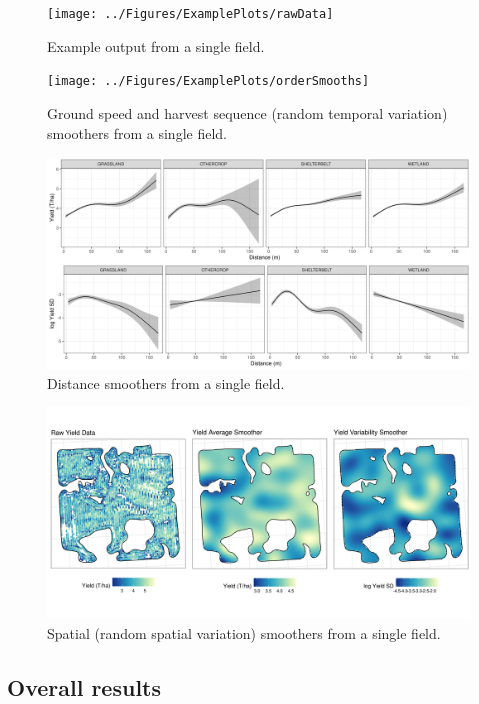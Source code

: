 \documentclass[]{elsarticle} %
\begin{document}
\begin{figure}
\texttt{[image: ../Figures/ExamplePlots/rawData]} \caption{Example output from a single field.}\label{fig:rawData}
\end{figure}

\begin{figure}
\texttt{[image: ../Figures/ExamplePlots/orderSmooths]} \caption{Ground speed and harvest sequence (random temporal variation) smoothers from a single field.}\label{fig:orderSmooths}
\end{figure}

\begin{figure}
\includegraphics[width=1\linewidth]{../Figures/ExamplePlots/distSmooths} \caption{Distance smoothers from a single field.}\label{fig:distSmooths}
\end{figure}

\begin{figure}
\includegraphics[width=1\linewidth]{../Figures/ExamplePlots/spatialSmooths} \caption{Spatial (random spatial variation) smoothers from a single field.}\label{fig:spatialSmooths}
\end{figure}

\hypertarget{overall-results}{%
\subsection{Overall results}\label{overall-results}}
\end{document}
